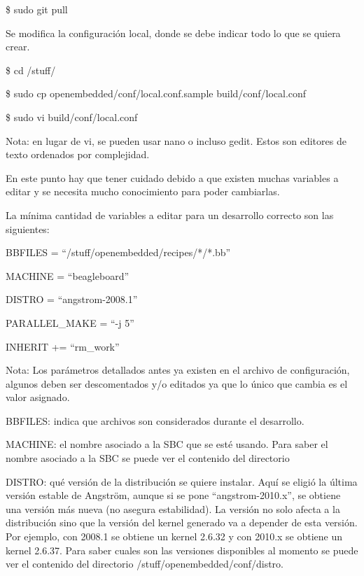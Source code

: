\centerline{\$ sudo git pull}

\bigskip
{}

\bigskip
Se modifica la configuración local, donde se debe indicar todo lo que se quiera crear.

\bigskip
\centerline{\$ cd /stuff/}

\centerline{\$ sudo cp openembedded/conf/local.conf.sample build/conf/local.conf}

\centerline{\$ sudo vi build/conf/local.conf}

\bigskip
Nota: en lugar de vi, se pueden usar nano o incluso gedit. Estos son editores de texto ordenados por complejidad.

\bigskip
En este punto hay que tener cuidado debido a que existen muchas variables a editar y se necesita mucho conocimiento para poder cambiarlas.


La mínima cantidad de variables a editar para un desarrollo correcto son las siguientes:

\bigskip
BBFILES = “/stuff/openembedded/recipes/*/*.bb”

MACHINE = “beagleboard”

DISTRO = “angstrom-2008.1”

PARALLEL\_MAKE = “-j 5”

INHERIT += “rm\_work”

\bigskip
Nota: Los parámetros detallados antes ya existen en el archivo de configuración, algunos deben ser descomentados y/o editados ya que lo único que cambia es el valor asignado.

\bigskip
BBFILES: indica que archivos son considerados durante el desarrollo.

\bigskip
MACHINE: el nombre asociado a la SBC que se esté usando. Para saber el nombre asociado a la SBC se puede ver el contenido del directorio


\bigskip
DISTRO: qué versión de la distribución se quiere instalar. Aquí se eligió la última versión estable de Angström, aunque si se pone “angstrom-2010.x”, se obtiene una versión más nueva (no asegura estabilidad). La versión no solo afecta a la distribución sino que la versión del kernel generado va a depender de esta versión. Por ejemplo, con 2008.1 se obtiene un kernel 2.6.32 y con 2010.x se obtiene un kernel 2.6.37. Para saber cuales son las versiones disponibles al momento se puede ver el contenido del directorio 
/stuff/openembedded/conf/distro.

